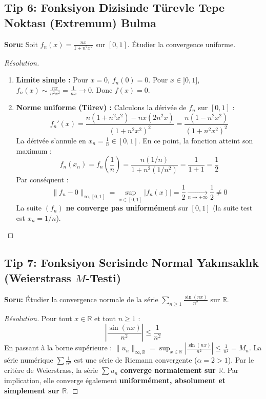 \documentclass[11pt,a4paper]{article}
\begin{document}
\subsection*{Tip 6: Fonksiyon Dizisinde Türevle Tepe Noktası (Extremum) Bulma}
\textbf{Soru:} Soit $f_n(x) = \frac{nx}{1+n^2 x^2}$ sur $[0, 1]$. Étudier la convergence uniforme.
\begin{proof}[Résolution]
\begin{enumerate}
    \item \textbf{Limite simple :} Pour $x=0$, $f_n(0)=0$. Pour $x \in ]0, 1]$, $f_n(x) \sim \frac{nx}{n^2 x^2} = \frac{1}{nx} \to 0$. Donc $f(x) = 0$.
    \item \textbf{Norme uniforme (Türev) :} Calculons la dérivée de $f_n$ sur $[0, 1]$ :
    \[ f_n'(x) = \frac{n(1+n^2 x^2) - nx(2n^2 x)}{(1+n^2 x^2)^2} = \frac{n(1 - n^2 x^2)}{(1+n^2 x^2)^2} \]
    La dérivée s'annule en $x_n = \frac{1}{n} \in [0, 1]$. En ce point, la fonction atteint son maximum :
    \[ f_n(x_n) = f_n\left(\frac{1}{n}\right) = \frac{n(1/n)}{1 + n^2(1/n^2)} = \frac{1}{1+1} = \frac{1}{2} \]
    Par conséquent :
    \[ \|f_n - 0\|_{\infty, [0, 1]} = \sup_{x \in [0, 1]} |f_n(x)| = \frac{1}{2} \xrightarrow[n \to +\infty]{} \frac{1}{2} \neq 0 \]
    La suite $(f_n)$ \textbf{ne converge pas uniformément} sur $[0, 1]$ (la suite test est $x_n = 1/n$).
\end{enumerate}
\end{proof}

\subsection*{Tip 7: Fonksiyon Serisinde Normal Yakınsaklık (Weierstrass $M$-Testi)}
\textbf{Soru:} Étudier la convergence normale de la série $\sum_{n \ge 1} \frac{\sin(nx)}{n^2}$ sur $\mathbb{R}$.
\begin{proof}[Résolution]
Pour tout $x \in \mathbb{R}$ et tout $n \ge 1$ :
\[ \left| \frac{\sin(nx)}{n^2} \right| \le \frac{1}{n^2} \]
En passant à la borne supérieure : $\|u_n\|_{\infty, \mathbb{R}} = \sup_{x \in \mathbb{R}} \left|\frac{\sin(nx)}{n^2}\right| \le \frac{1}{n^2} = M_n$.
La série numérique $\sum \frac{1}{n^2}$ est une série de Riemann convergente ($\alpha = 2 > 1$).
Par le critère de Weierstrass, la série $\sum u_n$ \textbf{converge normalement sur $\mathbb{R}$}.
Par implication, elle converge également \textbf{uniformément, absolument et simplement sur $\mathbb{R}$}.
\end{proof}
\end{document}
